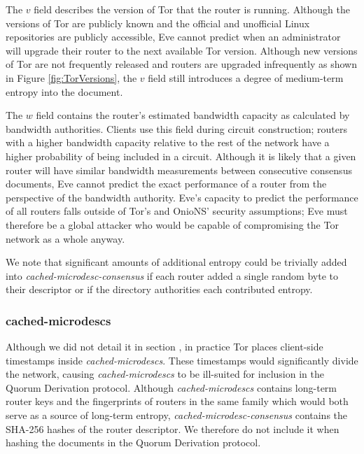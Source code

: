 \documentclass{sig-alternate}
\begin{document}

The $ v $ field describes the version of Tor that the router is running. Although the versions of Tor are publicly known and the official and unofficial Linux repositories are publicly accessible, Eve cannot predict when an administrator will upgrade their router to the next available Tor version. Although new versions of Tor are not frequently released and routers are upgraded infrequently as shown in Figure \ref{fig:TorVersions}, the $ v $ field still introduces a degree of medium-term entropy into the document.

The $ w $ field contains the router's estimated bandwidth capacity as calculated by bandwidth authorities. Clients use this field during circuit construction; routers with a higher bandwidth capacity relative to the rest of the network have a higher probability of being included in a circuit. Although it is likely that a given router will have similar bandwidth measurements between consecutive consensus documents, Eve cannot predict the exact performance of a router from the perspective of the bandwidth authority. Eve's capacity to predict the performance of all routers falls outside of Tor's and OnioNS' security assumptions; Eve must therefore be a global attacker who would be capable of compromising the Tor network as a whole anyway.

We note that significant amounts of additional entropy could be trivially added into \emph{cached-microdesc-consensus} if each router added a single random byte to their descriptor or if the directory authorities each contributed entropy.

\subsubsection{cached-microdescs}

Although we did not detail it in section \cite{TorDirSpec}, in practice Tor places client-side timestamps inside \emph{cached-microdescs}. These timestamps would significantly divide the network, causing \emph{cached-microdescs} to be ill-suited for inclusion in the Quorum Derivation protocol. Although \emph{cached-microdescs} contains long-term router keys and the fingerprints of routers in the same family which would both serve as a source of long-term entropy, \emph{cached-microdesc-consensus} contains the SHA-256 hashes of the router descriptor. We therefore do not include it when hashing the documents in the Quorum Derivation protocol.
\end{document}
